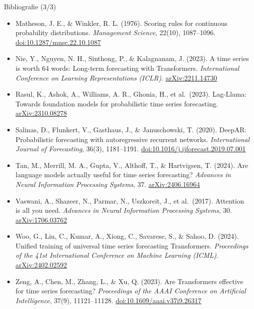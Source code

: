\begin{frame}{Bibliografie (3/3)}
\itemsize{\scriptsize}
\begin{itemize}
    \item Matheson, J. E., \& Winkler, R. L. (1976). Scoring rules for continuous probability distributions. \textit{Management Science}, 22(10), 1087--1096. \href{https://doi.org/10.1287/mnsc.22.10.1087}{doi:10.1287/mnsc.22.10.1087}
    \item Nie, Y., Nguyen, N. H., Sinthong, P., \& Kalagnanam, J. (2023). A time series is worth 64 words: Long-term forecasting with Transformers. \textit{International Conference on Learning Representations (ICLR)}. \href{https://arxiv.org/abs/2211.14730}{arXiv:2211.14730}
    \item Rasul, K., Ashok, A., Williams, A. R., Ghonia, H., et al.\ (2023). Lag-Llama: Towards foundation models for probabilistic time series forecasting. \href{https://arxiv.org/abs/2310.08278}{arXiv:2310.08278}
    \item Salinas, D., Flunkert, V., Gasthaus, J., \& Januschowski, T. (2020). DeepAR: Probabilistic forecasting with autoregressive recurrent networks. \textit{International Journal of Forecasting}, 36(3), 1181--1191. \href{https://doi.org/10.1016/j.ijforecast.2019.07.001}{doi:10.1016/j.ijforecast.2019.07.001}
    \item Tan, M., Merrill, M. A., Gupta, V., Althoff, T., \& Hartvigsen, T. (2024). Are language models actually useful for time series forecasting? \textit{Advances in Neural Information Processing Systems}, 37. \href{https://arxiv.org/abs/2406.16964}{arXiv:2406.16964}
    \item Vaswani, A., Shazeer, N., Parmar, N., Uszkoreit, J., et al.\ (2017). Attention is all you need. \textit{Advances in Neural Information Processing Systems}, 30. \href{https://arxiv.org/abs/1706.03762}{arXiv:1706.03762}
    \item Woo, G., Liu, C., Kumar, A., Xiong, C., Savarese, S., \& Sahoo, D. (2024). Unified training of universal time series forecasting Transformers. \textit{Proceedings of the 41st International Conference on Machine Learning (ICML)}. \href{https://arxiv.org/abs/2402.02592}{arXiv:2402.02592}
    \item Zeng, A., Chen, M., Zhang, L., \& Xu, Q. (2023). Are Transformers effective for time series forecasting? \textit{Proceedings of the AAAI Conference on Artificial Intelligence}, 37(9), 11121--11128. \href{https://doi.org/10.1609/aaai.v37i9.26317}{doi:10.1609/aaai.v37i9.26317}
\end{itemize}
\end{frame}


